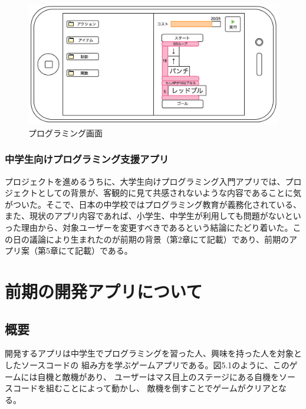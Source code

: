 \documentclass[openany,11pt,papersize]{jsbook}
\begin{document}
\begin{figure}[H]
\begin{center}
\includegraphics[width=12cm, bb=0 0 1173 563]{img/LegendOfN_programming.png}
\end{center}
\caption{プログラミング画面}
\end{figure}
 
 \subsection{中学生向けプログラミング支援アプリ}
\par プロジェクトを進めるうちに、大学生向けプログラミング入門アプリでは、プロジェクトとしての背景が、客観的に見て共感されないような内容であることに気がついた。そこで、日本の中学校ではプログラミング教育が義務化されている、また、現状のアプリ内容であれば、小学生、中学生が利用しても問題がないといった理由から、対象ユーザーを変更すべきであるという結論にたどり着いた。この日の議論により生まれたのが前期の背景（第2章にて記載）であり、前期のアプリ案（第5章にて記載）である。



\chapter{前期の開発アプリについて}
\section{概要}
開発するアプリは中学生でプログラミングを習った人、興味を持った人を対象としたソースコードの
組み方を学ぶゲームアプリである。図5.1のように、このゲームには自機と敵機があり、
ユーザーはマス目上のステージにある自機をソースコードを組むことによって動かし、
敵機を倒すことでゲームがクリアとなる。
\end{document}
